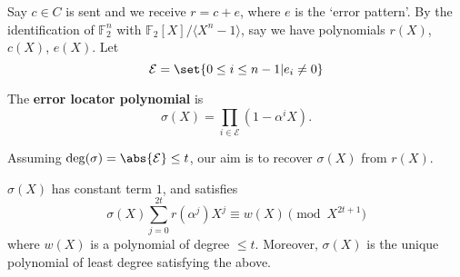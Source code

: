 \documentclass{article}
\newcommand{\F}{\mathbb{F}}
\newcommand{\1}[1]{\mathbbm{1}_{#1}}
\begin{document}
Say $c \in C$ is sent and we receive $r = c + e$, where $e$ is the `error pattern'.
By the identification of $\F_2^n$ with $\F_2[X]/\langle X^n - 1 \rangle$, say we have polynomials $r(X)$, $c(X)$, $e(X)$.
Let
\begin{equation*}
    \mathcal{E} = \set{0 \leq i \leq n-1 | e_i \neq 0}
\end{equation*}
\begin{defi}
    The \textbf{error locator polynomial} is
    \begin{equation*}
        \sigma(X) = \prod_{i \in \mathcal{E}} (1 - \alpha^i X).
    \end{equation*}
\end{defi}
Assuming $\deg(\sigma) = \abs{\mathcal{E}} \leq t$, our aim is to recover $\sigma(X)$ from $r(X)$.
\begin{nthm}\label{thm:2.34}
    $\sigma(X)$ has constant term $1$, and satisfies
    \begin{equation*}
        \sigma(X) \sum_{j=0}^{2t} r(\alpha^j) X^j \equiv w(X) \pmod{X^{2t+1}}
    \end{equation*}
    where $w(X)$ is a polynomial of degree $\leq t$.
    Moreover, $\sigma(X)$ is the unique polynomial of least degree satisfying the above.
\end{nthm}
\end{document}
